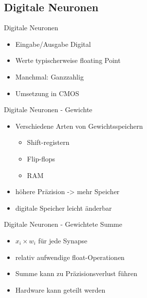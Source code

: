 \documentclass[handout]{beamer}
\begin{document}
    \subsection{Digitale Neuronen}

    \begin{frame}{Digitale Neuronen}
        \begin{itemize}[<+->]
            \item Eingabe/Ausgabe Digital
            \item Werte typischerweise floating Point
            \item Manchmal: Ganzzahlig
            \item Umsetzung in CMOS
        \end{itemize}
    \end{frame}

    \begin{frame}{Digitale Neuronen - Gewichte}
        \begin{itemize}[<+->]
            \item Verschiedene Arten von Gewichtsspeichern
            \begin{itemize}
                \item Shift-registern
                \item Flip-flops
                \item RAM
            \end{itemize}
            \item höhere Präzision -> mehr Speicher
            \item digitale Speicher leicht änderbar
        \end{itemize}
    \end{frame}

    \begin{frame}{Digitale Neuronen - Gewichtete Summe}
        \begin{itemize}[<+->]
            \item $x_i \times w_i$ für jede Synapse
            \item relativ aufwendige float-Operationen
            \item Summe kann zu Präzisionsverlust führen
            \item Hardware kann geteilt werden
        \end{itemize}
    \end{frame}
\end{document}
